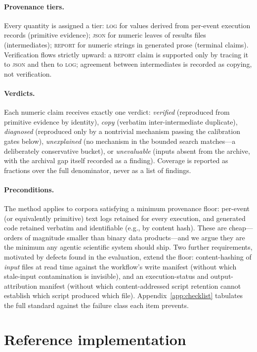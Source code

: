 \documentclass{article}
\begin{document}
\paragraph{Provenance tiers.} Every quantity is assigned a tier: \textsc{log} for values derived from per-event execution records (primitive evidence); \textsc{json} for numeric leaves of results files (intermediates); \textsc{report} for numeric strings in generated prose (terminal claims). Verification flows strictly upward: a \textsc{report} claim is supported only by tracing it to \textsc{json} and then to \textsc{log}; agreement between intermediates is recorded as copying, not verification.

\paragraph{Verdicts.} Each numeric claim receives exactly one verdict: \emph{verified} (reproduced from primitive evidence by identity), \emph{copy} (verbatim inter-intermediate duplicate), \emph{diagnosed} (reproduced only by a nontrivial mechanism passing the calibration gates below), \emph{unexplained} (no mechanism in the bounded search matches---a deliberately conservative bucket), or \emph{unevaluable} (inputs absent from the archive, with the archival gap itself recorded as a finding). Coverage is reported as fractions over the full denominator, never as a list of findings.

\paragraph{Preconditions.} The method applies to corpora satisfying a minimum provenance floor: per-event (or equivalently primitive) text logs retained for every execution, and generated code retained verbatim and identifiable (e.g., by content hash). These are cheap---orders of magnitude smaller than binary data products---and we argue they are the minimum any agentic scientific system should ship. Two further requirements, motivated by defects found in the evaluation, extend the floor: content-hashing of \emph{input} files at read time against the workflow's write manifest (without which stale-input contamination is invisible), and an execution-status and output-attribution manifest (without which content-addressed script retention cannot establish which script produced which file). Appendix~\ref{app:checklist} tabulates the full standard against the failure class each item prevents.

\section{Reference implementation}
\label{sec:pipeline}
\end{document}
